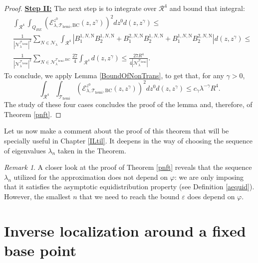 \documentclass{amsart}
\theoremstyle{definition}
\theoremstyle{remark}
\newtheorem{remark}[theorem]{Remark}
\newcommand{\ep}{\varepsilon}
\renewcommand\leq\leqslant
\numberwithin{equation}{section}
\theoremstyle{definition}
\theoremstyle{remark}
\begin{document}
\begin{proof}
\textbf{	\underline{Step II:}} The next step is to integrate over $\mathcal{R}^4$ and bound that integral: 
	\begin{equation}
		\begin{aligned}
			&\int_{\mathcal{R}^{4}}\int_{Q_{HE}}\left(\mathcal{E}_{\lambda,\mathcal{T}_\mathrm{hemi},\mathrm{BC}}^{z^0}(z,z^\gamma)\right)^2dz^0d(z,z^\gamma)\leq\\&\frac{1}{\left|\mathcal{N}_\lambda^{\mathcal{T}_\mathrm{hemi}}\right|^2}\sum_{N\in\mathcal{N}_\lambda}\int_{\mathcal{R}^{4}}\left|B_1^{1,N,\mathrm{N}}B_2^{1,N,\mathrm{N}}+B_1^{2,N,\mathrm{N}}B_2^{1,N,\mathrm{N}}+B_1^{1,N,\mathrm{N}}B_2^{2,N,\mathrm{N}}\right|d(z,z^\gamma)\leq\\&\frac{1}{\left|\mathcal{N}_\lambda^{\mathcal{T}_\mathrm{hemi}}\right|^2}\sum_{N\in\mathcal{N}_\lambda^{\mathcal{T}_\mathrm{hemi},\mathrm{BC}}}\frac{27}{4}\int_{\mathcal{R}^{4}}d(z,z^\gamma)\leq\frac{27R^4}{4\left|\mathcal{N}_\lambda^{\mathcal{T}_\mathrm{hemi}}\right|}.\end{aligned}\end{equation}
	To conclude, we apply Lemma \ref{BoundOfNonTrans}, to get that, for any $\gamma>0$, \begin{equation}
		\int_{\mathcal{R}^{4}}\int_{\mathcal{T}_\mathrm{hemi}}\left(\mathcal{E}_{\lambda,\mathcal{T}_\mathrm{hemi},\mathrm{BC}}^{z^0}(z,z^\gamma)\right)^2dz^0d(z,z^\gamma)\leq c_\gamma\lambda^{-\gamma}R^{4}.
	\end{equation}
	The study of these four cases concludes the proof of the lemma and, therefore, of Theorem \ref{pnft}.
\end{proof}

Let us now make a comment about the proof of this theorem that will be specially useful in Chapter \ref{ILtil}. It deepens in the way of choosing the sequence of eigenvalues $\lambda_n$ taken in the Theorem.
\begin{remark}\label{lambda}
	A closer look at the proof of Theorem \ref{pnft} reveals that the sequence $\lambda_n$ utilized for the approximation does not depend on $\varphi$: we are only imposing that it satisfies the asymptotic equidistribution property (see Definition \ref{aequid}). However, the smallest $n$ that we need to reach the bound $\ep$ does depend on $\varphi$.
\end{remark}

\section{Inverse localization around a fixed base point}\label{fp}
\end{document}

